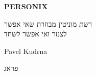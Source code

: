 \thispagestyle{empty}
\begin{center}
  {\sffamily\bfseries\fontsize{34}{40}\selectfont PERSONIX\par}
  \vspace{2.2em}
  {\rmfamily\large רשת מוניטין מבוזרת שאי אפשר\\[0.25em]
   לצנזר ואי אפשר לשחד\par}
\end{center}
\begin{center}
  {\rmfamily\Large Pavel Kudrna\par}
  \vspace{0.45em}
  {\rmfamily\small פראג\quad\textbullet{}\par}
\end{center}
\clearpage

